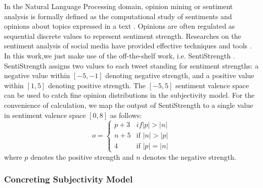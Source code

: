 \documentclass{acm_proc_article-sp}
\begin{document}
In the Natural Language Processing domain, opinion mining or sentiment analysis is formally defined as the computational study of sentiments and opinions about topics expressed in a text \cite{liu2012sentiment}. Opinions are often regulated as sequential discrete values to represent sentiment strength. Researches on the sentiment analysis of social media have provided effective techniques and tools \cite{thelwall2010sentiment,hu2013unsupervised}. In this work,we just make use of the off-the-shelf work, i.e. SentiStrength \cite{thelwall2010sentiment}. 
SentiStrength assigns two values to each tweet standing for sentiment strengths: a negative value within $ \left[ -5,-1 \right]  $ denoting negative strength, and a positive value within $ \left[ 1,5 \right]  $ denoting  positive strength. The $ \left[ -5,5 \right] $ sentiment valence space can be used to catch fine opinion distributions in the subjectivity model. 
For the convenience of calculation, we map the output of SentiStrength to a single value in sentiment valence space $ \left[ 0, 8 \right] $ as follows:
\begin{equation}
\label{opinionmap}
o= \left\{ 
\begin{array}{lll}
{p+3} & if \vert p \vert > \vert n \vert \\
{n+5} & \text{if } \vert n \vert > \vert p \vert \\
{4}  & \text{if } \vert p \vert = \vert n \vert
\end{array}
\right.
\end{equation}
where $ p $ denotes the positive strength and $ n $ denotes the negative strength. 

\subsubsection{Concreting Subjectivity Model}
\label{concrete}
 
\end{document}
